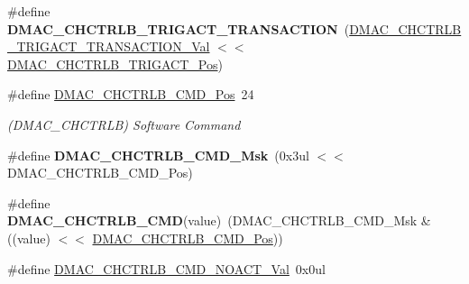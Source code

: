 \begin{DoxyCompactItemize}
\item 
\hypertarget{group___s_a_m_l21___d_m_a_c_ga9eab478165d067cfd3a570c536204202}{}\#define {\bfseries D\+M\+A\+C\+\_\+\+C\+H\+C\+T\+R\+L\+B\+\_\+\+T\+R\+I\+G\+A\+C\+T\+\_\+\+T\+R\+A\+N\+S\+A\+C\+T\+I\+O\+N}~(\hyperlink{group___s_a_m_l21___d_m_a_c_gab0c773cec6c091dc3bb20e4ccf5699c6}{D\+M\+A\+C\+\_\+\+C\+H\+C\+T\+R\+L\+B\+\_\+\+T\+R\+I\+G\+A\+C\+T\+\_\+\+T\+R\+A\+N\+S\+A\+C\+T\+I\+O\+N\+\_\+\+Val} $<$$<$ \hyperlink{group___s_a_m_l21___d_m_a_c_gaada77814aa3858a4b49aabef88429c31}{D\+M\+A\+C\+\_\+\+C\+H\+C\+T\+R\+L\+B\+\_\+\+T\+R\+I\+G\+A\+C\+T\+\_\+\+Pos})\label{group___s_a_m_l21___d_m_a_c_ga9eab478165d067cfd3a570c536204202}

\item 
\hypertarget{group___s_a_m_l21___d_m_a_c_ga7a6624b9ffc32912d6db81c95a81be97}{}\#define \hyperlink{group___s_a_m_l21___d_m_a_c_ga7a6624b9ffc32912d6db81c95a81be97}{D\+M\+A\+C\+\_\+\+C\+H\+C\+T\+R\+L\+B\+\_\+\+C\+M\+D\+\_\+\+Pos}~24\label{group___s_a_m_l21___d_m_a_c_ga7a6624b9ffc32912d6db81c95a81be97}

\begin{DoxyCompactList}\small\item\em (D\+M\+A\+C\+\_\+\+C\+H\+C\+T\+R\+L\+B) Software Command \end{DoxyCompactList}\item 
\hypertarget{group___s_a_m_l21___d_m_a_c_ga088050d1f86599244bb852a465afd63b}{}\#define {\bfseries D\+M\+A\+C\+\_\+\+C\+H\+C\+T\+R\+L\+B\+\_\+\+C\+M\+D\+\_\+\+Msk}~(0x3ul $<$$<$ D\+M\+A\+C\+\_\+\+C\+H\+C\+T\+R\+L\+B\+\_\+\+C\+M\+D\+\_\+\+Pos)\label{group___s_a_m_l21___d_m_a_c_ga088050d1f86599244bb852a465afd63b}

\item 
\hypertarget{group___s_a_m_l21___d_m_a_c_gaa1adb82ed7419282796947ae3130af79}{}\#define {\bfseries D\+M\+A\+C\+\_\+\+C\+H\+C\+T\+R\+L\+B\+\_\+\+C\+M\+D}(value)~(D\+M\+A\+C\+\_\+\+C\+H\+C\+T\+R\+L\+B\+\_\+\+C\+M\+D\+\_\+\+Msk \& ((value) $<$$<$ \hyperlink{group___s_a_m_l21___d_m_a_c_ga7a6624b9ffc32912d6db81c95a81be97}{D\+M\+A\+C\+\_\+\+C\+H\+C\+T\+R\+L\+B\+\_\+\+C\+M\+D\+\_\+\+Pos}))\label{group___s_a_m_l21___d_m_a_c_gaa1adb82ed7419282796947ae3130af79}

\item 
\hypertarget{group___s_a_m_l21___d_m_a_c_ga7b3affd4205334c28e3965856ba441e7}{}\#define \hyperlink{group___s_a_m_l21___d_m_a_c_ga7b3affd4205334c28e3965856ba441e7}{D\+M\+A\+C\+\_\+\+C\+H\+C\+T\+R\+L\+B\+\_\+\+C\+M\+D\+\_\+\+N\+O\+A\+C\+T\+\_\+\+Val}~0x0ul\label{group___s_a_m_l21___d_m_a_c_ga7b3affd4205334c28e3965856ba441e7}


\end{DoxyCompactItemize}
